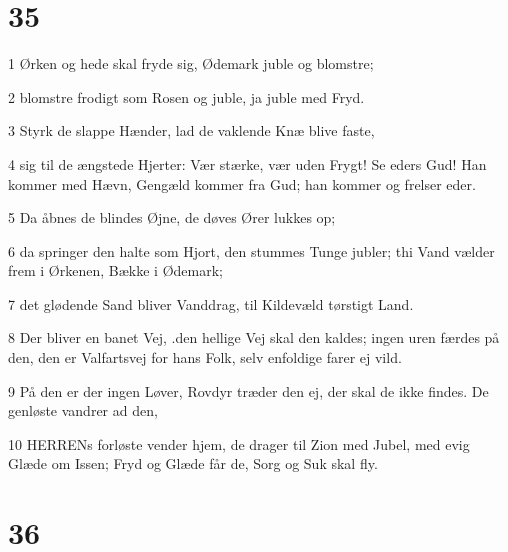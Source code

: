 \chapter{35}

\par 1 Ørken og hede skal fryde sig, Ødemark juble og blomstre;
\par 2 blomstre frodigt som Rosen og juble, ja juble med Fryd.
\par 3 Styrk de slappe Hænder, lad de vaklende Knæ blive faste,
\par 4 sig til de ængstede Hjerter: Vær stærke, vær uden Frygt! Se eders Gud! Han kommer med Hævn, Gengæld kommer fra Gud; han kommer og frelser eder.
\par 5 Da åbnes de blindes Øjne, de døves Ører lukkes op;
\par 6 da springer den halte som Hjort, den stummes Tunge jubler; thi Vand vælder frem i Ørkenen, Bække i Ødemark;
\par 7 det glødende Sand bliver Vanddrag, til Kildevæld tørstigt Land.
\par 8 Der bliver en banet Vej, .den hellige Vej skal den kaldes; ingen uren færdes på den, den er Valfartsvej for hans Folk, selv enfoldige farer ej vild.
\par 9 På den er der ingen Løver, Rovdyr træder den ej, der skal de ikke findes. De genløste vandrer ad den,
\par 10 HERRENs forløste vender hjem, de drager til Zion med Jubel, med evig Glæde om Issen; Fryd og Glæde får de, Sorg og Suk skal fly.

\chapter{36}

